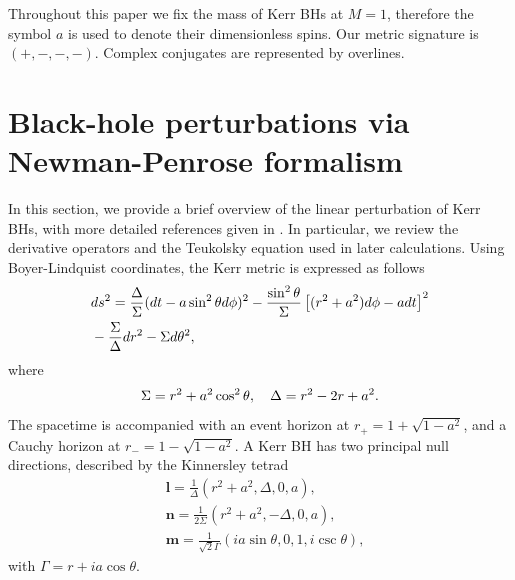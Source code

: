 \documentclass[aps,prd,amsmath,floats,floatfix, twocolumn,
superscriptaddress,nofootinbib,showpacs]{revtex4-1}
\begin{document}
Throughout this paper we fix the mass of Kerr BHs at $M=1$, therefore the symbol $a$ is used to denote their dimensionless spins. Our metric signature is $(+, -, -, -)$. Complex conjugates are represented by overlines.



\section{Black-hole perturbations via Newman-Penrose formalism}
\label{sec:perturbation_review}
In this section, we provide a brief overview of the linear perturbation of Kerr BHs, with more detailed references given in \cite{Kokkotas:1999bd,Berti:2009kk,chandrasekhar1998mathematical}. In particular, we review the derivative operators and the Teukolsky equation used in later calculations. Using Boyer-Lindquist coordinates, the Kerr metric is expressed as follows
\begin{align}
    &ds^2=\frac{\Delta}{\Sigma} (dt-a\sin^2\theta d\phi)^2-\frac{\sin^2\theta}{\Sigma}\left[(r^2+a^2)d\phi-adt\right]^2\notag \\
    &-\frac{\Sigma}{\Delta}dr^2-\Sigma d\theta^2,
\end{align}
where 
\begin{align}
    \Sigma=r^2+a^2\cos^2\theta, \quad \Delta=r^2-2r+a^2. \notag 
\end{align}
The spacetime is accompanied with an event horizon at $r_+=1+\sqrt{1-a^2}$, and a Cauchy horizon at $r_-=1-\sqrt{1-a^2}$.
A Kerr BH has two principal null directions, described by the Kinnersley tetrad
\begin{equation}
\label{eq:Kinnersley}
   \begin{aligned}
    &\bm{l}=\frac{1}{\Delta}\left(r^2+a^2,\Delta,0,a\right), \\
    &\bm{n}=\frac{1}{2\Sigma}\left(r^2+a^2,-\Delta,0,a\right), \\
    & \bm{m} = \frac{1}{\sqrt{2}\Gamma}(ia\sin\theta, 0, 1, i\csc\theta),
\end{aligned} 
\end{equation}
with $\Gamma=r+ia\cos\theta$. 
\end{document}
